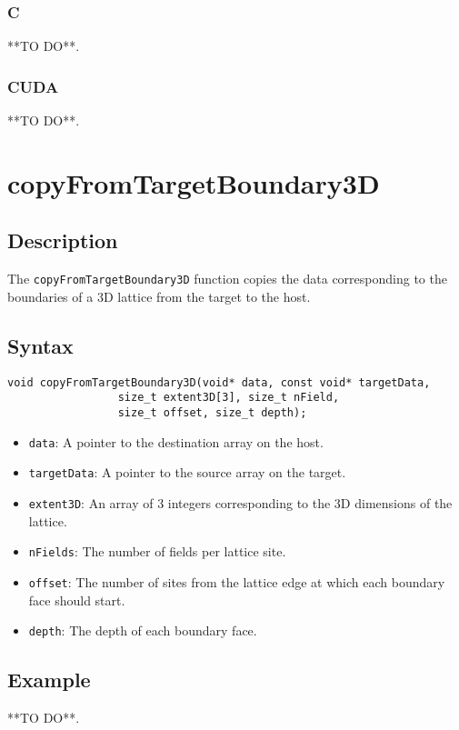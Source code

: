 \subsubsection{C}
**TO DO**.
\subsubsection{CUDA}
**TO DO**.

\newpage
\section{copyFromTargetBoundary3D}

\subsection{Description}

The \verb+copyFromTargetBoundary3D+ function copies the data corresponding to the boundaries of a 3D lattice from the target to the host.

\subsection{Syntax}
\begin{verbatim}
void copyFromTargetBoundary3D(void* data, const void* targetData, 
                 size_t extent3D[3], size_t nField, 
                 size_t offset, size_t depth);
\end{verbatim}

\begin{itemize}
\item \verb+data+: A pointer to the destination array on the host.
\item \verb+targetData+: A pointer to the source array on the target.
\item \verb+extent3D+: An array of 3 integers corresponding to the 3D dimensions of the lattice.
\item \verb+nFields+: The number of fields per lattice site.
\item \verb+offset+: The number of sites from the lattice edge at which each boundary face should start.
\item \verb+depth+: The depth of each boundary face.
\end{itemize}


\subsection{Example}
**TO DO**.
